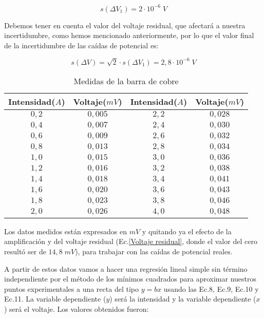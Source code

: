 \documentclass[a4paper,12pt,titlepage]{article}
\begin{document}
\begin{equation}
    s(\Delta V_{1}) = 2 \cdot 10^{-6}\; V
\end{equation}

Debemos tener en cuenta el valor del voltaje residual, que afectará a nuestra incertidumbre, como hemos mencionado anteriormente, por lo que el valor final de la incertidumbre de las caídas de potencial es:

\begin{equation}
    s(\Delta V) = \sqrt{2}\cdot s(\Delta V_{1}) = 2,8 \cdot 10^{-6} \; V
\end{equation}



\bigskip

\begin{table}[h!]
    \centering
    \begin{tabular}{|c|c|c|c|}
        \hline Intensidad($A$) & Voltaje($mV$) & Intensidad($A$) & Voltaje($mV$) \\
        \hline
        $0,2$ & $0,005$ & $2,2$ & $0,028$\\
        \hline
        $0,4$ & $0,007$ & $2,4$ & $0,030$  \\
        \hline
        $0,6$ & $0,009$ & $2,6$ & $0,032$  \\
        \hline
        $0,8$ & $0,013$ & $2,8$ & $0,034$  \\
        \hline
        $1,0$ & $0,015$ & $3,0$ & $0,036$  \\
        \hline
        $1,2$ & $0,016$ & $3,2$ & $0,038$  \\
        \hline
        $1,4$ & $0,018$ & $3,4$ & $0,041$  \\
        \hline
        $1,6$ & $0,020$ & $3,6$ & $0,043$  \\
        \hline
        $1,8$ & $0,023$ & $3,8$ & $0,046$  \\
        \hline
        $2,0$ & $0,026$ & $4,0$ & $0,048$  \\
        \hline
    \end{tabular}
    \caption{Medidas de la barra de cobre}
\end{table}

Los datos medidos están expresados en $mV$ y quitando ya el efecto de la amplificación y del voltaje residual (Ec.\ref{Voltaje residual}, donde el valor del cero resultó ser de $14,8 \; mV$), para trabajar con las caídas de potencial reales.

\par A partir de estos datos vamos a hacer una regresión lineal simple sin término independiente por el método de los mínimos cuadrados para aproximar nuestros puntos experimentales a una recta del tipo $y=bx$ usando las Ec.8, Ec.9, Ec.10 y Ec.11. La variable dependiente ($y$) será la intensidad y la variable dependiente ($x$) será el voltaje. Los valores obtenidos fueron:
\end{document}

